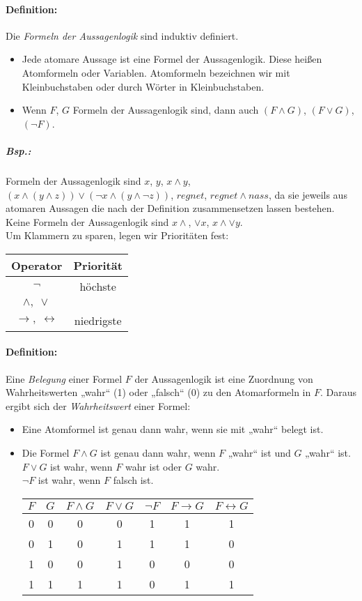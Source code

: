 \paragraph{Definition:} Die \emph{Formeln der Aussagenlogik} sind induktiv definiert.

\begin{itemize}
\item Jede atomare Aussage ist eine Formel der Aussagenlogik. Diese heißen Atomformeln oder Variablen. 
Atomformeln bezeichnen wir mit Kleinbuchstaben oder durch Wörter in Kleinbuchstaben.
\item Wenn $F$, $G$ Formeln der Aussagenlogik sind, dann auch $(F \wedge G)$, $(F\vee G)$, $(\neg F)$.
\end{itemize}

\subparagraph{Bsp.:} Formeln der Aussagenlogik sind $x$, $y$, $x\wedge y$, $( x\wedge (y \wedge z)) \vee (\neg x \wedge (y \wedge \neg z))$, $regnet$, $regnet \wedge nass$, da sie jeweils aus atomaren Aussagen die nach der Definition zusammensetzen lassen bestehen.\\
Keine Formeln der Aussagenlogik sind $x\wedge$, $\vee x$, $x\wedge \vee y$.\\
Um Klammern zu sparen, legen wir Prioritäten fest:\\
\begin{tabular}{c | c}
Operator & Priorität \\
\hline
$\neg$ & höchste\\
$\wedge ,\; \vee$ & \\
$\rightarrow , \; \leftrightarrow$ & niedrigste\\
\end{tabular}

\paragraph{Definition:} Eine \emph{Belegung} einer Formel $F$ der Aussagenlogik ist eine Zuordnung von Wahrheitswerten „wahr“ (1) oder „falsch“ (0) zu den Atomarformeln in $F$.
Daraus ergibt sich der \emph{Wahrheitswert} einer Formel:
\begin{itemize}
\item Eine Atomformel ist genau dann wahr, wenn sie mit „wahr“ belegt ist.
\item Die Formel $F\wedge G $ ist genau dann wahr, wenn $F$ „wahr“ ist und $G$ „wahr“ ist. \\
$F\vee G$ ist wahr, wenn $F$ wahr ist oder $G$ wahr.\\
$\neg F$ ist wahr, wenn $F$ falsch ist.\\
\begin{tabular}{c c | c c c c c}
$F$&$G$&$F\wedge G$&$F\vee G$&$\neg F$&$F\rightarrow G$& $F\leftrightarrow G$\\
\hline
0&0&0&0&1&1&1\\
0&1&0&1&1&1&0\\
1&0&0&1&0&0&0\\
1&1&1&1&0&1&1\\
\end{tabular}
\end{itemize}

